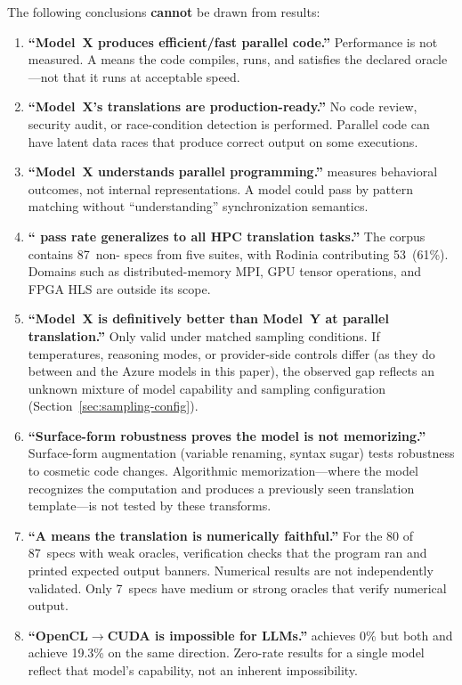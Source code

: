 The following conclusions \textbf{cannot} be drawn from \parbench{} results:

\begin{enumerate}
  \item \textbf{``Model~X produces efficient/fast parallel code.''} Performance
    is not measured. A \pass{} means the code compiles, runs, and satisfies the
    declared oracle---not that it runs at acceptable speed.
    
    \item \textbf{``Model~X's translations are production-ready.''} No code review, security audit, or race-condition detection is performed. Parallel code can have latent data races that produce correct output on some executions.
    
    \item \textbf{``Model~X understands parallel programming.''} \parbench{}
    measures behavioral outcomes, not internal representations. A model could
    pass by pattern matching without ``understanding'' synchronization
    semantics.

  \item \textbf{``\parbench{} pass rate generalizes to all HPC translation
    tasks.''} The corpus contains 87~non-\knownfail{} specs from five
    suites, with Rodinia contributing 53~(61\%). Domains such as distributed-memory MPI, GPU tensor operations, and FPGA HLS are outside its scope.

  \item \textbf{``Model~X is definitively better than Model~Y at parallel translation.''} Only valid under matched sampling conditions. If temperatures, reasoning modes, or provider-side controls differ (as they do between \qwenshort{} and the Azure models in this paper), the observed gap reflects an unknown mixture of model capability and sampling configuration (Section~\ref{sec:sampling-config}).

  \item \textbf{``Surface-form robustness proves the model is not
    memorizing.''} Surface-form augmentation (variable renaming, syntax sugar)
    tests robustness to cosmetic code changes. Algorithmic memorization---where
    the model recognizes the computation and produces a previously seen
    translation template---is not tested by these transforms.

  \item \textbf{``A \pass{} means the translation is numerically faithful.''}
    For the 80 of 87~specs with weak oracles, verification checks that the
    program ran and printed expected output banners. Numerical results are not
    independently validated. Only 7~specs have medium or strong oracles that
    verify numerical output.

    \item \textbf{``OpenCL$\to$CUDA is impossible for LLMs.''} \qwenshort{} achieves 0\% but both \gptnew{} and \codex{} achieve 19.3\% on the same direction. Zero-rate results for a single model reflect that model's capability, not an inherent impossibility.
\end{enumerate}

